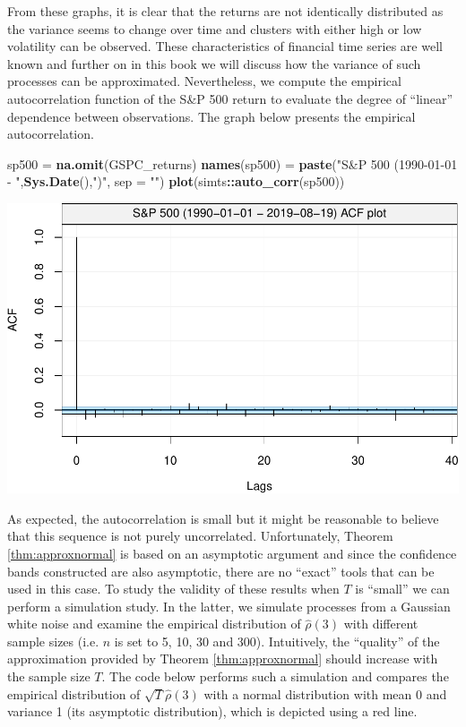 \documentclass[]{book}
\newenvironment{Shaded}{\begin{snugshade}}{\end{snugshade}}
\newcommand{\DataTypeTok}[1]{\textcolor[rgb]{0.13,0.29,0.53}{#1}}
\newcommand{\KeywordTok}[1]{\textcolor[rgb]{0.13,0.29,0.53}{\textbf{#1}}}
\newcommand{\NormalTok}[1]{#1}
\newcommand{\OperatorTok}[1]{\textcolor[rgb]{0.81,0.36,0.00}{\textbf{#1}}}
\newcommand{\StringTok}[1]{\textcolor[rgb]{0.31,0.60,0.02}{#1}}
\theoremstyle{definition}
\theoremstyle{definition}
\theoremstyle{definition}
\theoremstyle{remark}
\begin{document}
From these graphs, it is clear that the returns are not identically
distributed as the variance seems to change over time and clusters with
either high or low volatility can be observed. These characteristics of
financial time series are well known and further on in this book we will
discuss how the variance of such processes can be approximated.
Nevertheless, we compute the empirical autocorrelation function of the
S\&P 500 return to evaluate the degree of ``linear'' dependence between
observations. The graph below presents the empirical autocorrelation.

\begin{Shaded}
\begin{Highlighting}[]
\NormalTok{sp500 =}\StringTok{ }\KeywordTok{na.omit}\NormalTok{(GSPC_returns)}
\KeywordTok{names}\NormalTok{(sp500) =}\StringTok{ }\KeywordTok{paste}\NormalTok{(}\StringTok{"S&P 500 (1990-01-01 - "}\NormalTok{,}\KeywordTok{Sys.Date}\NormalTok{(),}\StringTok{")"}\NormalTok{, }\DataTypeTok{sep =} \StringTok{""}\NormalTok{)}
\KeywordTok{plot}\NormalTok{(simts}\OperatorTok{::}\KeywordTok{auto_corr}\NormalTok{(sp500))}
\end{Highlighting}
\end{Shaded}

\includegraphics{ts_files/figure-latex/GSPCacf-1.pdf}

As expected, the autocorrelation is small but it might be reasonable to
believe that this sequence is not purely uncorrelated. Unfortunately,
Theorem \ref{thm:approxnormal} is based on an asymptotic argument and
since the confidence bands constructed are also asymptotic, there are no
``exact'' tools that can be used in this case. To study the validity of
these results when \(T\) is ``small'' we can perform a simulation study.
In the latter, we simulate processes from a Gaussian white noise and
examine the empirical distribution of \(\hat{\rho}(3)\) with different
sample sizes (i.e. \(n\) is set to 5, 10, 30 and 300). Intuitively, the
``quality'' of the approximation provided by Theorem
\ref{thm:approxnormal} should increase with the sample size \(T\). The
code below performs such a simulation and compares the empirical
distribution of \(\sqrt{T} \hat{\rho}(3)\) with a normal distribution
with mean 0 and variance 1 (its asymptotic distribution), which is
depicted using a red line.
\end{document}
